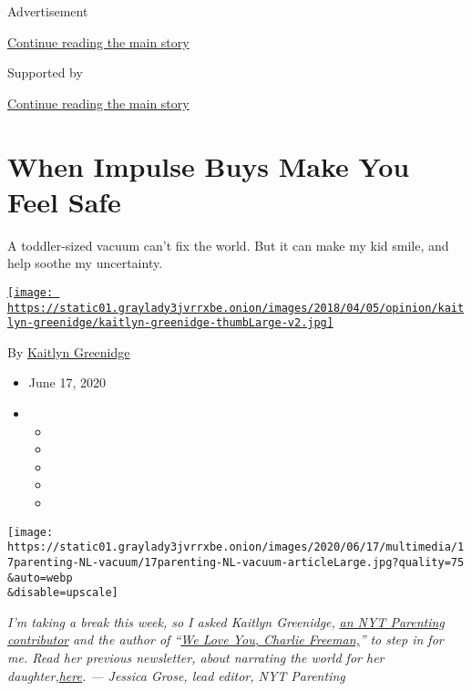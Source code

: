 Advertisement

\protect\hyperlink{after-top}{Continue reading the main story}

Supported by

\protect\hyperlink{after-sponsor}{Continue reading the main story}

\hypertarget{when-impulse-buys-make-you-feel-safe}{%
\section{When Impulse Buys Make You Feel
Safe}\label{when-impulse-buys-make-you-feel-safe}}

A toddler-sized vacuum can't fix the world. But it can make my kid
smile, and help soothe my uncertainty.

\href{https://www.nytimes3xbfgragh.onion/by/kaitlyn-greenidge}{\texttt{[image: https://static01.graylady3jvrrxbe.onion/images/2018/04/05/opinion/kaitlyn-greenidge/kaitlyn-greenidge-thumbLarge-v2.jpg]}}

By
\href{https://www.nytimes3xbfgragh.onion/by/kaitlyn-greenidge}{Kaitlyn
Greenidge}

\begin{itemize}
\item
  June 17, 2020
\item
  \begin{itemize}
  \item
  \item
  \item
  \item
  \item
  \end{itemize}
\end{itemize}

\texttt{[image: https://static01.graylady3jvrrxbe.onion/images/2020/06/17/multimedia/17parenting-NL-vacuum/17parenting-NL-vacuum-articleLarge.jpg?quality=75\\\&auto=webp\\\&disable=upscale]}

\emph{I'm taking a break this week, so I asked Kaitlyn Greenidge,}
\href{https://www.nytimes3xbfgragh.onion/2020/04/16/parenting/baby/work-conference-life-balance.html}{\emph{an
NYT Parenting contributor}} \emph{and the author of
``}\href{https://www.workman.com/products/we-love-you-charlie-freeman}{\emph{We
Love You, Charlie Freeman,}}\emph{''} \emph{to step in for me. Read her
previous newsletter, about narrating the world for her
daughter,}\href{https://www.nytimes3xbfgragh.onion/2020/02/26/parenting/making-awkward-small-talk-with-my-baby.html}{\emph{here}}\emph{.
--- Jessica Grose, lead editor, NYT Parenting}


